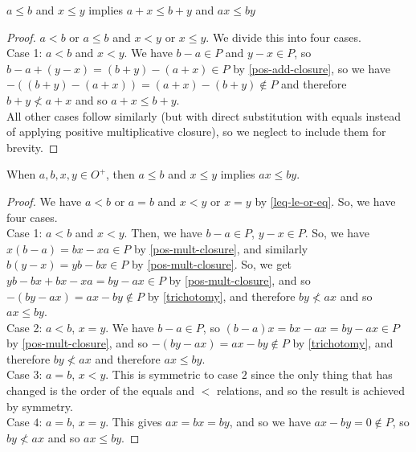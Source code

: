\begin{theorem}\label{add-compatible-leq}
$a \le b$ and $x \le y$ implies $a+x \le b+y$ and $ax \le by$
\end{theorem}
\begin{proof}
$a < b$ or $a\le b$ and $x < y$ or $x \le y$. We divide this into four cases. \\

Case 1: $a < b$ and $x < y$. We have $b-a \in P$ and $y-x \in P$, so $b-a + (y-x) = (b+y)-(a+x) \in P$ by \ref{pos-add-closure}, so we have $-((b+y)-(a+x)) = (a+x) - (b+y) \notin P$ and therefore $b+y \nless a+x$ and so $a+x \le b+y$. \\

All other cases follow similarly (but with direct substitution with equals instead of applying positive multiplicative closure), so we neglect to include them for brevity.
\end{proof}

\begin{theorem}\label{pos-mult-compatible-leq}
When $a, b, x, y \in O^+$, then $a \le b$ and $x \le y$ implies $ax \le by$.
\end{theorem}
\begin{proof}
We have $a < b$ or $a = b$ and $x < y$ or $x=y$ by \ref{leq-le-or-eq}. So, we have four cases. \\

Case 1: $a<b$ and $x<y$. Then, we have $b-a \in P$, $y-x \in P$. So, we have $x(b-a) = bx-xa \in P$ by \ref{pos-mult-closure}, and similarly $b(y-x) = yb - bx \in P$ by \ref{pos-mult-closure}. So, we get $yb-bx + bx - xa = by - ax \in P$ by \ref{pos-mult-closure}, and so $-(by-ax) = ax-by \notin P$ by \ref{trichotomy}, and therefore $by \nless ax$ and so $ax \le by$. \\

Case 2: $a < b$, $x=y$. We have $b-a \in P$, so $(b-a)x = bx - ax = by - ax \in P$ by \ref{pos-mult-closure}, and so $-(by-ax) = ax-by \notin P$ by \ref{trichotomy}, and therefore $by \nless ax$ and therefore $ax \le by$. \\

Case $3$: $a = b$, $x < y$. This is symmetric to case $2$ since the only thing that has changed is the order of the equals and $<$ relations, and so the result is achieved by symmetry. \\

Case $4$: $a = b$, $x =y$. This gives $ax = bx = by$, and so we have $ax - by = 0 \notin P$, so $by \nless ax$ and so $ax \le by$. 
\end{proof}

